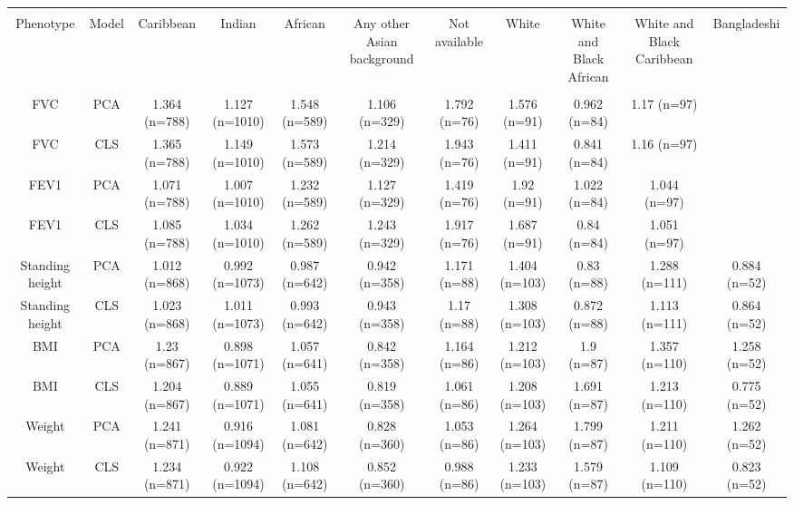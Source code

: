 \begin{landscape}

\begin{table}[!htbp] \centering 
\tiny 
{}
\begin{tabular}{ ccccccccccc} 
\\[-1.8ex]\hline 
\hline \\[-1.8ex] 
Phenotype & Model & Caribbean & Indian & African & Any other Asian background & Not available & White & White and Black African & White and Black Caribbean & Bangladeshi \\ 
\hline \\[-1.8ex] 
FVC & PCA & 1.364 (n=788) & 1.127 (n=1010) & 1.548 (n=589) & 1.106 (n=329) & 1.792 (n=76) & 1.576 (n=91) & 0.962 (n=84) & 1.17 (n=97) &  \\ 
FVC & CLS & 1.365 (n=788) & 1.149 (n=1010) & 1.573 (n=589) & 1.214 (n=329) & 1.943 (n=76) & 1.411 (n=91) & 0.841 (n=84) & 1.16 (n=97) &  \\ 
FEV1 & PCA & 1.071 (n=788) & 1.007 (n=1010) & 1.232 (n=589) & 1.127 (n=329) & 1.419 (n=76) & 1.92 (n=91) & 1.022 (n=84) & 1.044 (n=97) &  \\ 
FEV1 & CLS & 1.085 (n=788) & 1.034 (n=1010) & 1.262 (n=589) & 1.243 (n=329) & 1.917 (n=76) & 1.687 (n=91) & 0.84 (n=84) & 1.051 (n=97) &  \\ 
Standing height & PCA & 1.012 (n=868) & 0.992 (n=1073) & 0.987 (n=642) & 0.942 (n=358) & 1.171 (n=88) & 1.404 (n=103) & 0.83 (n=88) & 1.288 (n=111) & 0.884 (n=52) \\ 
Standing height & CLS & 1.023 (n=868) & 1.011 (n=1073) & 0.993 (n=642) & 0.943 (n=358) & 1.17 (n=88) & 1.308 (n=103) & 0.872 (n=88) & 1.113 (n=111) & 0.864 (n=52) \\ 
BMI & PCA & 1.23 (n=867) & 0.898 (n=1071) & 1.057 (n=641) & 0.842 (n=358) & 1.164 (n=86) & 1.212 (n=103) & 1.9 (n=87) & 1.357 (n=110) & 1.258 (n=52) \\ 
BMI & CLS & 1.204 (n=867) & 0.889 (n=1071) & 1.055 (n=641) & 0.819 (n=358) & 1.061 (n=86) & 1.208 (n=103) & 1.691 (n=87) & 1.213 (n=110) & 0.775 (n=52) \\ 
Weight & PCA & 1.241 (n=871) & 0.916 (n=1094) & 1.081 (n=642) & 0.828 (n=360) & 1.053 (n=86) & 1.264 (n=103) & 1.799 (n=87) & 1.211 (n=110) & 1.262 (n=52) \\ 
Weight & CLS & 1.234 (n=871) & 0.922 (n=1094) & 1.108 (n=642) & 0.852 (n=360) & 0.988 (n=86) & 1.233 (n=103) & 1.579 (n=87) & 1.109 (n=110) & 0.823 (n=52) \\ 

\end{tabular}
\end{table}
\end{landscape}
